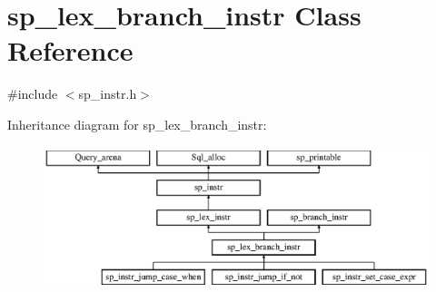 \hypertarget{classsp__lex__branch__instr}{}\section{sp\+\_\+lex\+\_\+branch\+\_\+instr Class Reference}
\label{classsp__lex__branch__instr}


{\ttfamily \#include $<$sp\+\_\+instr.\+h$>$}

Inheritance diagram for sp\+\_\+lex\+\_\+branch\+\_\+instr\+:\begin{figure}[H]
\begin{center}
\leavevmode
\includegraphics[height=4.166667cm]{classsp__lex__branch__instr}
\end{center}
\end{figure}
